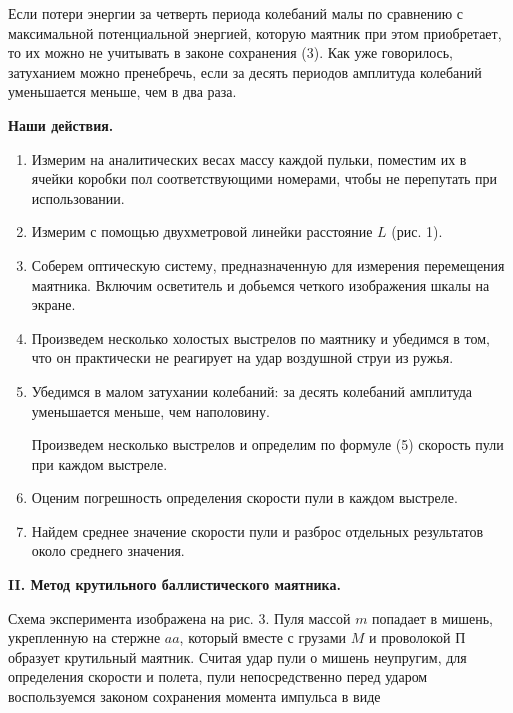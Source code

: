 \documentclass[14pt]{article}
\begin{document}
Если потери энергии за четверть периода колебаний малы по сравнению с максимальной потенциальной энергией, которую маятник при этом приобретает, то их можно не учитывать в законе сохранения (3). Как уже говорилось, затуханием можно пренебречь, если за десять периодов амплитуда колебаний уменьшается меньше, чем в два раза.

\newpage
\vspace{1cm}
\textbf{Наши действия.}
\vspace{1cm}

\begin{flushleft}
\begin{enumerate}
\item  Измерим на аналитических весах массу каждой пульки, поместим их в ячейки коробки пол соответствующими номерами, чтобы не перепутать при использовании.

\item Измерим с помощью двухметровой линейки расстояние $L$ (рис. 1).

\item Соберем оптическую систему, предназначенную для измерения перемещения маятника. Включим осветитель и добьемся четкого изображения шкалы на экране.

\item Произведем несколько холостых выстрелов по маятнику и убедимся в том, что он практически не реагирует на удар воздушной струи из
ружья.

\item Убедимся в малом затухании колебаний: за десять колебаний амплитуда уменьшается меньше, чем наполовину.

Произведем несколько выстрелов и определим по формуле (5) скорость пули при каждом выстреле.

\item Оценим погрешность определения скорости пули в каждом выстреле.

\item Найдем среднее значение скорости пули и разброс отдельных результатов около среднего значения.
\end{enumerate}
\end{flushleft}

\newpage
\textbf{II. Метод крутильного баллистического маятника.}

Схема эксперимента изображена на рис. 3. Пуля массой $m$ попадает в мишень, укрепленную на стержне $aa$, который вместе с грузами $M$ и проволокой $\text{П}$ образует крутильный маятник. Считая удар пули о мишень неупругим, для определения скорости и полета, пули непосредственно перед ударом воспользуемся законом сохранения момента импульса в виде
\end{document}
